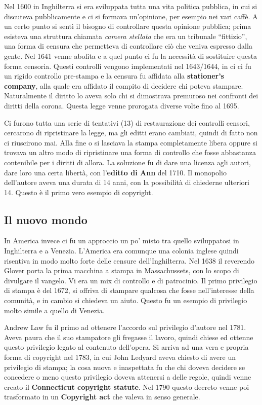 Nel 1600 in Inghilterra si era sviluppata tutta una vita politica pubblica, in cui si discuteva pubblicamente e ci si formava un'opinione, per esempio nei vari caffè. A un certo punto si sentì il bisogno di controllare questa opinione pubblica; prima esisteva una struttura chiamata \textit{camera stellata} che era un tribunale ``fittizio'', una forma di censura che permetteva di controllare ciò che veniva espresso dalla gente. Nel 1641 venne abolita e a quel punto ci fu la necessità di sostituire questa forma censoria. Questi controlli vengono implementati nel 1643/1644, in ci ci fu un rigido controllo pre-stampa e la censura fu affidata alla \textbf{stationer's company}, alla quale era affidato il compito di decidere chi poteva stampare. Naturalmente il diritto lo aveva solo chi si dimostrava premuroso nei confronti dei diritti della corona. Questa legge venne prorogata diverse volte fino al 1695. 

Ci furono tutta una serie di tentativi (13) di restaurazione dei controlli censori, cercarono di ripristinare la legge, ma gli editti erano cambiati, quindi di fatto non ci riuscirono mai. Alla fine o si lasciava la stampa completamente libera oppure si trovava un altro modo di ripristinare una forma di controllo che fosse abbastanza contenibile per i diritti di allora. La soluzione fu di dare una licenza agli autori, dare loro una certa libertà, con l'\textbf{editto di Ann} del 1710. Il monopolio dell'autore aveva una durata di 14 anni, con la possibilità di chiederne ulteriori 14. Questo è il primo vero esempio di copyright. 

\subsection{Il nuovo mondo}

In America invece ci fu un approccio un po' misto tra quello sviluppatosi in Inghilterra e a Venezia. L'America era comunque una colonia inglese quindi risentiva in modo molto forte delle censure dell'Inghilterra. Nel 1638 il reverendo Glover porta la prima macchina a stampa in Massachussets, con lo scopo di divulgare il vangelo. Vi era un mix di controllo e di patrocinio.  Il primo privilegio di stampa è del 1672, si offriva di stampare qualcosa che fosse nell'interesse della comunità, e in cambio si chiedeva un aiuto. Questo fu un esempio di privilegio molto simile a quello di Venezia. 

Andrew Law fu il primo ad ottenere l'accordo sul privilegio d'autore nel 1781. Aveva paura che il suo stampatore gli fregasse il lavoro, quindi chiese ed ottenne questo privilegio legato al contenuto dell'opera. Si arriva ad una vera e propria forma di copyright nel 1783, in cui John Ledyard aveva chiesto di avere un privilegio di stampa; la cosa nuova e inaspettata fu che chi doveva decidere se concedere o meno questo privilegio doveva attenersi a delle regole, quindi venne creato il \textbf{Connecticut copyright statute}. Nel 1790 questo decreto venne poi trasformato in un \textbf{Copyright act} che valeva in senso generale.

